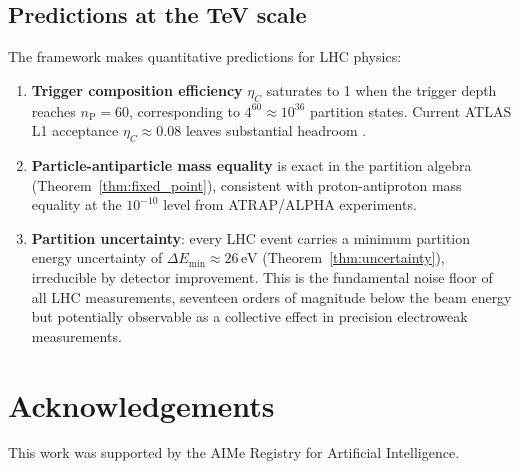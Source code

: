 \documentclass[twocolumn,10pt,a4paper]{article}
\theoremstyle{thmstyle}
\theoremstyle{definition}
\theoremstyle{remark}
\newcommand{\nP}{n_{\mathrm{P}}}
\newcommand{\etaC}{\eta_{C}}
\begin{document}
\subsection{Predictions at the TeV scale}

The framework makes quantitative predictions for LHC physics:

\begin{enumerate}[nosep]
\item \textbf{Trigger composition efficiency} $\etaC$ saturates to 1 when
the trigger depth reaches $\nP = 60$, corresponding to
$4^{60} \approx 10^{36}$ partition states. Current ATLAS L1 acceptance
$\etaC \approx 0.08$ leaves substantial headroom
\citep{companion:planck}.

\item \textbf{Particle-antiparticle mass equality} is exact in the partition
algebra (Theorem~\ref{thm:fixed_point}), consistent with proton-antiproton
mass equality at the $10^{-10}$ level from ATRAP/ALPHA experiments.

\item \textbf{Partition uncertainty}: every LHC event carries a minimum
partition energy uncertainty of $\Delta E_{\min} \approx 26\,\mathrm{eV}$
(Theorem~\ref{thm:uncertainty}), irreducible by detector improvement.
This is the fundamental noise floor of all LHC measurements, seventeen
orders of magnitude below the beam energy but potentially observable
as a collective effect in precision electroweak measurements.
\end{enumerate}

\section*{Acknowledgements}
This work was supported by the AIMe Registry for Artificial Intelligence.



\end{document}
